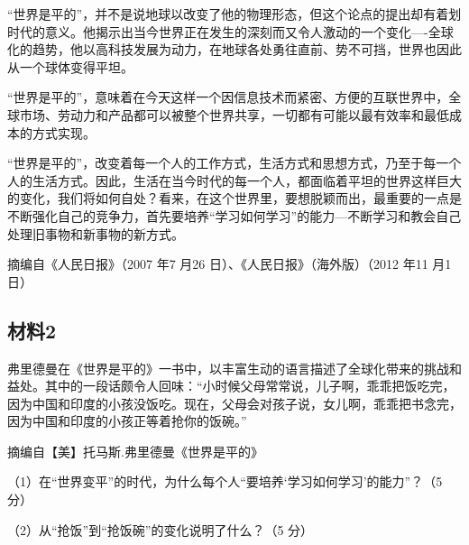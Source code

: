 \documentclass[UTF8,11pt]{ctexart}
\begin{document}
“世界是平的”，并不是说地球以改变了他的物理形态，但这个论点的提出却有着划时代的意义。他揭示出当今世界正在发生的深刻而又令人激动的一个变化----全球化的趋势，他以高科技发展为动力，在地球各处勇往直前、势不可挡，世界也因此从一个球体变得平坦。

“世界是平的”，意味着在今天这样一个因信息技术而紧密、方便的互联世界中，全球市场、劳动力和产品都可以被整个世界共享，一切都有可能以最有效率和最低成本的方式实现。

“世界是平的”，改变着每一个人的工作方式，生活方式和思想方式，乃至于每一个人的生活方式。因此，生活在当今时代的每一个人，都面临着平坦的世界这样巨大的变化，我们将如何自处？看来，在这个世界里，要想脱颖而出，最重要的一点是不断强化自己的竞争力，首先要培养“学习如何学习”的能力---不断学习和教会自己处理旧事物和新事物的新方式。

摘编自《人民日报》（2007 年7 月26 日）、《人民日报》（海外版）（2012 年11 月1 日）

\subsection*{材料2}

弗里德曼在《世界是平的》一书中，以丰富生动的语言描述了全球化带来的挑战和益处。其中的一段话颇令人回味：“小时候父母常常说，儿子啊，乖乖把饭吃完，因为中国和印度的小孩没饭吃。现在，父母会对孩子说，女儿啊，乖乖把书念完，因为中国和印度的小孩正等着抢你的饭碗。”

摘编自【美】托马斯.弗里德曼《世界是平的》

（1）在“世界变平”的时代，为什么每个人“要培养‘学习如何学习’的能力”？（5 分）


（2）从“抢饭”到“抢饭碗”的变化说明了什么？（5 分）
\end{document}
